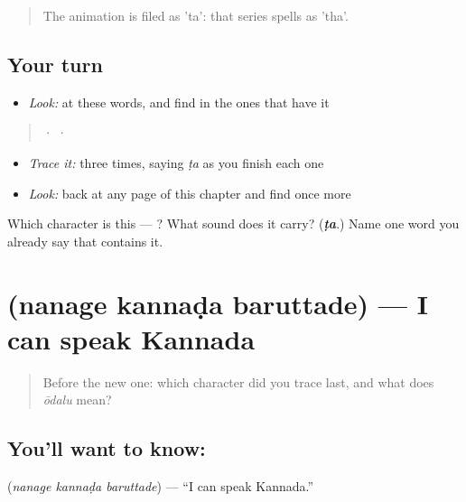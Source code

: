 \begin{quote}
The animation is filed as 'ta': that series spells  as 'tha'.
\end{quote}

\subsection*{Your turn}
\begin{itemize}
\raggedright
  \item \emph{Look:} at these words, and find  in the ones that have it
\end{itemize}

\begin{quote}
  ·    ·  
\end{quote}

\begin{itemize}
\raggedright
  \item \emph{Trace it:}  three times, saying \emph{ṭa} as you finish each one
  \item \emph{Look:} back at any page of this chapter and find  once more
\end{itemize}

\begin{tcolorbox}[breakable,colback=teal!4,colframe=teal!35!black,title={Before you move on}]
Which character is this — ? What sound does it carry? (\emph{\textbf{ṭa}}.) Name one word you already say that contains it.
\end{tcolorbox}
\section[\texorpdfstring{\kn{ನನಗೆ} \kn{ಕನ್ನಡ} \kn{ಬರುತ್ತದೆ} (nanage kannaḍa …)}{ನನಗೆ ಕನ್ನಡ ಬರುತ್ತದೆ (nanage kannaḍa …)}]{   (nanage kannaḍa baruttade) — I can speak Kannada}

\label{lesson:KA-C73-can}



\begin{quote}
Before the new one: which character did you trace last, and what does \emph{ōdalu} mean?
\end{quote}

\subsection*{You'll want to know:   }
\textbf{  } (\emph{nanage kannaḍa baruttade}) — \textquotedblleft{}I can speak Kannada.\textquotedblright{}

